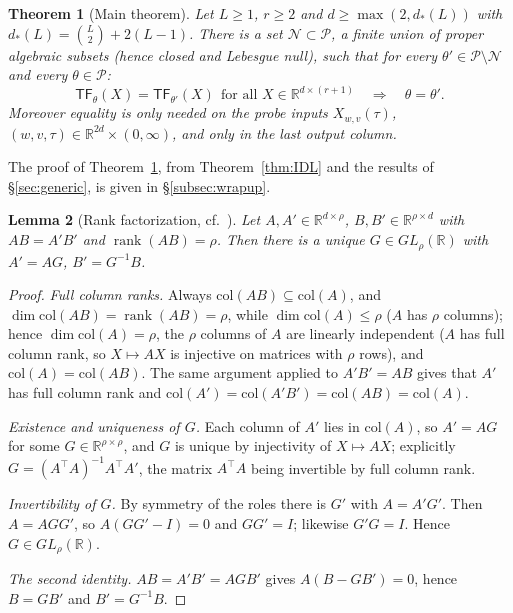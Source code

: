 \documentclass[11pt]{article}
\newtheorem{theorem}{Theorem}[section]
\newtheorem{lemma}[theorem]{Lemma}
\theoremstyle{definition}
\theoremstyle{remark}
\theoremstyle{plain}
\newcommand{\R}{\mathbb{R}}
\newcommand{\cP}{\mathcal{P}}
\newcommand{\cN}{\mathcal{N}}
\newcommand{\rank}{\operatorname{rank}}
\newcommand{\TF}{\mathsf{TF}}
\begin{document}
\begin{theorem}[Main theorem]\label{thm:main}
Let $L\ge1$, $r\ge2$ and $d\ge\max(2,d_*(L))$ with $d_*(L)=\binom L2+2(L-1)$.  There is a
set $\cN\subset\cP$, a finite union of proper algebraic subsets (hence closed and Lebesgue
null), such that for every $\theta'\in\cP\setminus\cN$ and every $\theta\in\cP$:
\[
\TF_\theta(X)=\TF_{\theta'}(X)\ \ \text{for all }X\in\R^{d\times(r+1)}
\quad\Longrightarrow\quad \theta=\theta'.
\]
Moreover equality is only needed on the probe inputs $X_{w,v}(\tau)$,
$(w,v,\tau)\in\R^{2d}\times(0,\infty)$, and only in the last output column.
\end{theorem}

The proof of Theorem~\ref{thm:main}, from Theorem~\ref{thm:IDL} and the results of
\S\ref{sec:generic}, is given in \S\ref{subsec:wrapup}.

\begin{lemma}[Rank factorization, cf.\ \cite{henry2025geometry}]\label{lem:lift}
Let $A,A'\in\R^{d\times \rho}$, $B,B'\in\R^{\rho\times d}$ with $AB=A'B'$ and
$\rank(AB)=\rho$.  Then there is a unique $G\in GL_\rho(\R)$ with $A'=AG$, $B'=G^{-1}B$.
\end{lemma}

\begin{proof}
\emph{Full column ranks.}  Always $\mathrm{col}(AB)\subseteq\mathrm{col}(A)$, and
$\dim\mathrm{col}(AB)=\rank(AB)=\rho$, while $\dim\mathrm{col}(A)\le\rho$ ($A$ has $\rho$
columns); hence $\dim\mathrm{col}(A)=\rho$, the $\rho$ columns of $A$ are linearly
independent ($A$ has full column rank, so $X\mapsto AX$ is injective on matrices with
$\rho$ rows), and $\mathrm{col}(A)=\mathrm{col}(AB)$.  The same argument applied to
$A'B'=AB$ gives that $A'$ has full column rank and
$\mathrm{col}(A')=\mathrm{col}(A'B')=\mathrm{col}(AB)=\mathrm{col}(A)$.

\emph{Existence and uniqueness of $G$.}  Each column of $A'$ lies in $\mathrm{col}(A)$, so
$A'=AG$ for some $G\in\R^{\rho\times\rho}$, and $G$ is unique by injectivity of
$X\mapsto AX$; explicitly $G=(A^\top A)^{-1}A^\top A'$, the matrix $A^\top A$ being
invertible by full column rank.

\emph{Invertibility of $G$.}  By symmetry of the roles there is $G'$ with $A=A'G'$.  Then
$A=AGG'$, so $A(GG'-I)=0$ and $GG'=I$; likewise $G'G=I$.  Hence $G\in GL_\rho(\R)$.

\emph{The second identity.}  $AB=A'B'=AGB'$ gives $A(B-GB')=0$, hence $B=GB'$ and
$B'=G^{-1}B$.
\end{proof}
\end{document}
